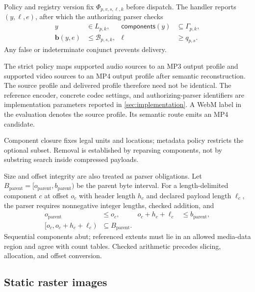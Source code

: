 Policy and registry version fix \(\Phi_{p,v,s,\ell,k}\) before dispatch. The handler reports
\((y,\ell,e)\), after which the authorizing parser checks
\[
\begin{aligned}
 y&\in L_{p,k},&
 \mathsf{components}(y)&\subseteq\Gamma_{p,k},\\
 \mathbf b(y,e)&\le\mathcal B_{p,s,k},&
 \ell&\ge q_{p,s}.
\end{aligned}
\]
Any false or indeterminate conjunct prevents delivery.

The strict policy maps supported audio sources to an MP3 output profile and
supported video sources to an MP4 output profile after semantic reconstruction.
The source profile and delivered profile therefore need not be identical. The
reference encoder, concrete codec settings, and authorizing-parser identifiers
are implementation parameters reported in \cref{sec:implementation}. A WebM
label in the evaluation denotes the source profile. Its semantic route emits an
MP4 candidate.

Component closure fixes legal units and locations; metadata policy restricts
the optional subset. Removal is established by reparsing components, not by
substring search inside compressed payloads.

Size and offset integrity are also treated as parser obligations. Let
\(B_{\mathrm{parent}}=[o_{\mathrm{parent}},b_{\mathrm{parent}})\) be the
parent byte interval. For a length-delimited component \(c\) at offset \(o_c\)
with header length \(h_c\) and declared payload length \(\ell_c\), the parser
requires nonnegative integer lengths, checked addition, and
\begin{equation}
\begin{aligned}
o_{\mathrm{parent}}&\le o_c,&
o_c+h_c+\ell_c&\leq b_{\mathrm{parent}},\\
[o_c,o_c+h_c+\ell_c)&\subseteq B_{\mathrm{parent}}.&&
\end{aligned}
\label{eq:component-bounds}
\end{equation}
Sequential components abut; referenced extents must lie in an allowed
media-data region and agree with count tables. Checked arithmetic precedes
slicing, allocation, and offset conversion.

\subsection{Static raster images}\label{subsec:static-raster-method}

